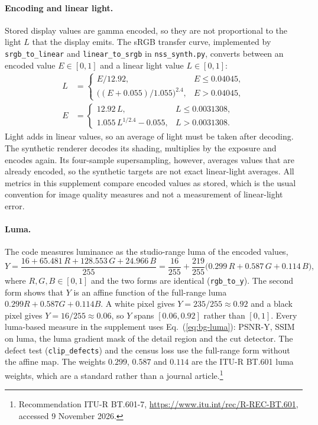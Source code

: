 \paragraph{Encoding and linear light.} Stored display values are gamma encoded, so they are not proportional to the light $L$ that the display emits. The sRGB transfer curve, implemented by \texttt{srgb\_to\_linear} and \texttt{linear\_to\_srgb} in \texttt{nss\_synth.py}, converts between an encoded value $E\in[0,1]$ and a linear light value $L\in[0,1]$:
\begin{align}
L&=\begin{cases}E/12.92, & E\le 0.04045,\\ \big((E+0.055)/1.055\big)^{2.4}, & E>0.04045,\end{cases}\label{eq:bg-srgb}\\
E&=\begin{cases}12.92\,L, & L\le 0.0031308,\\ 1.055\,L^{1/2.4}-0.055, & L>0.0031308.\end{cases}\nonumber
\end{align}
Light adds in linear values, so an average of light must be taken after decoding. The synthetic renderer decodes its shading, multiplies by the exposure and encodes again. Its four-sample supersampling, however, averages values that are already encoded, so the synthetic targets are not exact linear-light averages. All metrics in this supplement compare encoded values as stored, which is the usual convention for image quality measures and not a measurement of linear-light error.

\paragraph{Luma.} The code measures luminance as the studio-range luma of the encoded values,
\begin{equation}
Y=\frac{16+65.481\,R+128.553\,G+24.966\,B}{255}=\frac{16}{255}+\frac{219}{255}\big(0.299\,R+0.587\,G+0.114\,B\big),\label{eq:bg-luma}
\end{equation}
where $R,G,B\in[0,1]$ and the two forms are identical (\texttt{rgb\_to\_y}). The second form shows that $Y$ is an affine function of the full-range luma $0.299R+0.587G+0.114B$. A white pixel gives $Y=235/255\approx0.92$ and a black pixel gives $Y=16/255\approx0.06$, so $Y$ spans $[0.06,0.92]$ rather than $[0,1]$. Every luma-based measure in the supplement uses Eq.~(\ref{eq:bg-luma}): PSNR-Y, SSIM on luma, the luma gradient mask of the detail region and the cut detector. The defect test (\texttt{clip\_defects}) and the census loss use the full-range form without the affine map. The weights $0.299$, $0.587$ and $0.114$ are the ITU-R BT.601 luma weights, which are a standard rather than a journal article.\footnote{Recommendation ITU-R BT.601-7, \url{https://www.itu.int/rec/R-REC-BT.601}, accessed 9 November 2026.}

